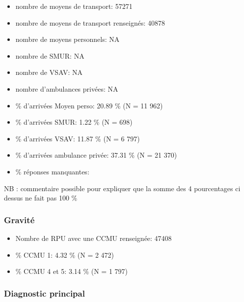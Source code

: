 \documentclass[]{article}
\begin{document}
\begin{itemize}
\item
  nombre de moyens de transport: 57271
\item
  nombre de moyens de transport renseignés: 40878
\item
  nombre de moyens personnels: NA
\item
  nombre de SMUR: NA
\item
  nombre de VSAV: NA
\item
  nombre d'ambulances privées: NA
\item
  \% d'arrivées Moyen perso: 20.89 \% (N = 11 962)
\item
  \% d'arrivées SMUR: 1.22 \% (N = 698)
\item
  \% d'arrivées VSAV: 11.87 \% (N = 6 797)
\item
  \% d'arrivées ambulance privée: 37.31 \% (N = 21 370)
\item
  \% réponses manquantes:
\end{itemize}

NB : commentaire possible pour expliquer que la somme des 4 pourcentages
ci dessus ne fait pas 100 \%

\subsubsection{Gravité}\label{gravite}

\begin{itemize}
\itemsep1pt\parskip0pt
\item
  Nombre de RPU avec une CCMU renseignée: 47408
\item
  \% CCMU 1: 4.32 \% (N = 2 472)
\item
  \% CCMU 4 et 5: 3.14 \% (N = 1 797)
\end{itemize}

\subsubsection{Diagnostic principal}\label{diagnostic-principal}
\end{document}
